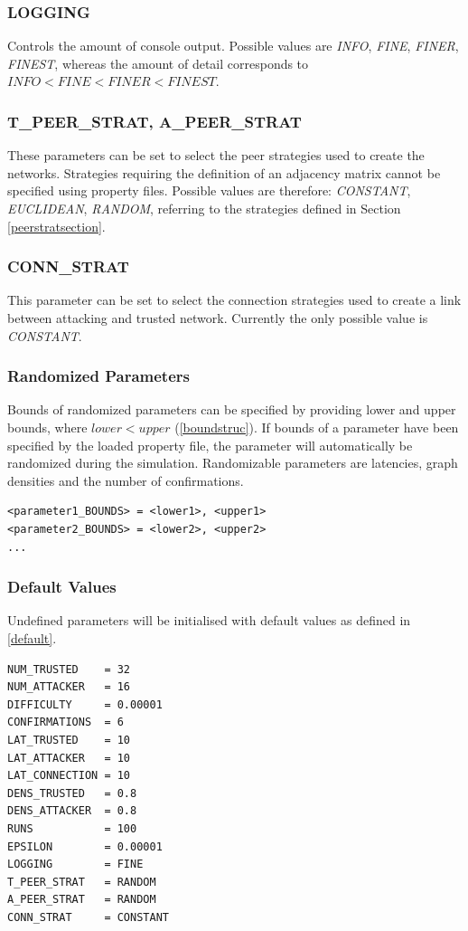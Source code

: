 \documentclass[a4paper,12pt,twoside]{report}
\begin{document}
\subsubsection{LOGGING}
Controls the amount of console output. Possible values are \textit{INFO}, \textit{FINE}, \textit{FINER}, \textit{FINEST}, whereas the amount of detail corresponds to $\textit{INFO} < \textit{FINE} < \textit{FINER} < \textit{FINEST}$.
\subsubsection{T\_PEER\_STRAT, A\_PEER\_STRAT}
These parameters can be set to select the peer strategies used to create the networks. Strategies requiring the definition of an adjacency matrix cannot be specified using property files. Possible values are therefore: \textit{CONSTANT}, \textit{EUCLIDEAN}, \textit{RANDOM}, referring to the strategies defined in Section \ref{peerstratsection}.
\subsubsection{CONN\_STRAT}
This parameter can be set to select the connection strategies used to create a link between attacking and trusted network. Currently the only possible value is \textit{CONSTANT}.
\subsubsection{Randomized Parameters}
Bounds of randomized parameters can be specified by providing lower and upper bounds, where $lower < upper$ (\autoref{boundstruc}). If bounds of a parameter have been specified by the loaded property file, the parameter will automatically be randomized during the simulation. Randomizable parameters are latencies, graph densities and the number of confirmations.
\begin{lstlisting}[caption=Defining bounds of randomized parameters,label=boundstruc]
<parameter1_BOUNDS> = <lower1>, <upper1>
<parameter2_BOUNDS> = <lower2>, <upper2>
...
\end{lstlisting}
\subsubsection{Default Values}\label{defaultval}
Undefined parameters will be initialised with default values as defined in \autoref{default}. 
\begin{lstlisting}[caption=Default parameter values,label=default]
NUM_TRUSTED    = 32
NUM_ATTACKER   = 16
DIFFICULTY     = 0.00001
CONFIRMATIONS  = 6
LAT_TRUSTED    = 10
LAT_ATTACKER   = 10
LAT_CONNECTION = 10
DENS_TRUSTED   = 0.8
DENS_ATTACKER  = 0.8
RUNS           = 100
EPSILON        = 0.00001
LOGGING        = FINE
T_PEER_STRAT   = RANDOM
A_PEER_STRAT   = RANDOM
CONN_STRAT     = CONSTANT
\end{lstlisting}
\end{document}
